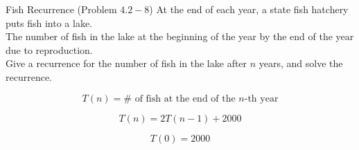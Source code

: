 
\begin{frame}{}
  \centerline{}

\end{frame}

\begin{frame}{}
  \begin{exampleblock}{Fish Recurrence (Problem $4.2-8$)}
    At the end of each year, a state fish hatchery puts  fish into a lake. \\[6pt]

    The number of fish in the lake at the beginning of the year  by the end of the year 
    due to reproduction. \\[6pt]
    
    Give a recurrence for the number of fish in the lake after $n$ years, and solve the recurrence.
  \end{exampleblock}

  \pause
  \[
    T(n) = \# \text{ of fish at the end of the } n\text{-th year}
  \]

  \pause
  \[
    T(n) = 2T(n-1) + 2000
  \]

  \pause
  \[
    T(0) = 2000
  \]
\end{frame}
